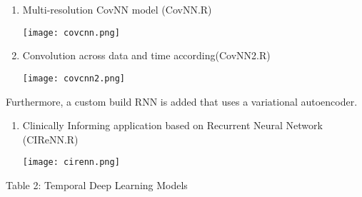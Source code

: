 \documentclass[
]{article}
\begin{document}
\begin{enumerate}
\def\labelenumi{\arabic{enumi}.}
\item
  Multi-resolution CovNN model (CovNN.R)

  \texttt{[image: covcnn.png]}
\item
  Convolution across data and time according(CovNN2.R)

  \texttt{[image: covcnn2.png]}

  \newpage
\end{enumerate}

Furthermore, a custom build RNN is added that uses a variational
autoencoder.

\begin{enumerate}
\def\labelenumi{\arabic{enumi}.}
\setcounter{enumi}{2}
\item
  Clinically Informing application based on Recurrent Neural Network
  (CIReNN.R)

  \texttt{[image: cirenn.png]}
\end{enumerate}

Table 2: Temporal Deep Learning Models
\end{document}
